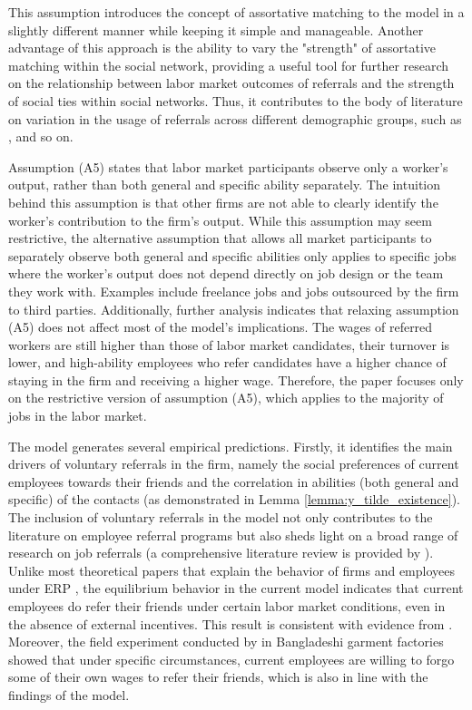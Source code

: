 \documentclass[12pt]{article}
\begin{document}
This assumption introduces the concept of assortative matching to the model in a slightly different manner while keeping it simple and manageable. Another advantage of this approach is the ability to vary the "strength" of assortative matching within the social network, providing a useful tool for further research on the relationship between labor market outcomes of referrals and the strength of social ties within social networks. Thus, it contributes to the body of literature on variation in the usage of referrals across different demographic groups, such as \cite{montgomery1994weak, granovetter1995coase, calvo2004effects, kuzubas2009endogenous, lester2021heterogeneous}, and so on.

Assumption (A5) states that labor market participants observe only a worker's output, rather than both general and specific ability separately. The intuition behind this assumption is that other firms are not able to clearly identify the worker's contribution to the firm's output. While this assumption may seem restrictive, the alternative assumption that allows all market participants to separately observe both general and specific abilities only applies to specific jobs where the worker's output does not depend directly on job design or the team they work with. Examples include freelance jobs and jobs outsourced by the firm to third parties. Additionally, further analysis indicates that relaxing assumption (A5) does not affect most of the model's implications. The wages of referred workers are still higher than those of labor market candidates, their turnover is lower, and high-ability employees who refer candidates have a higher chance of staying in the firm and receiving a higher wage. Therefore, the paper focuses only on the restrictive version of assumption (A5), which applies to the majority of jobs in the labor market.

The model generates several empirical predictions. Firstly, it identifies the main drivers of voluntary referrals in the firm, namely the social preferences of current employees towards their friends and the correlation in abilities (both general and specific) of the contacts (as demonstrated in Lemma \ref{lemma:y_tilde_existence}). The inclusion of voluntary referrals in the model not only contributes to the literature on employee referral programs but also sheds light on a broad range of research on job referrals (a comprehensive literature review is provided by \cite{topa2011labor}). Unlike most theoretical papers that explain the behavior of firms and employees under ERP \citep{beaman2012gets, ekinci2016employee}, the equilibrium behavior in the current model indicates that current employees do refer their friends under certain labor market conditions, even in the absence of external incentives. This result is consistent with evidence from \cite{holzer1987hiring, granovetter1995coase, pellizzari2010friends, lester2021heterogeneous}. Moreover, the field experiment conducted by \cite{heath2018firms} in Bangladeshi garment factories showed that under specific circumstances, current employees are willing to forgo some of their own wages to refer their friends, which is also in line with the findings of the model.
\end{document}
